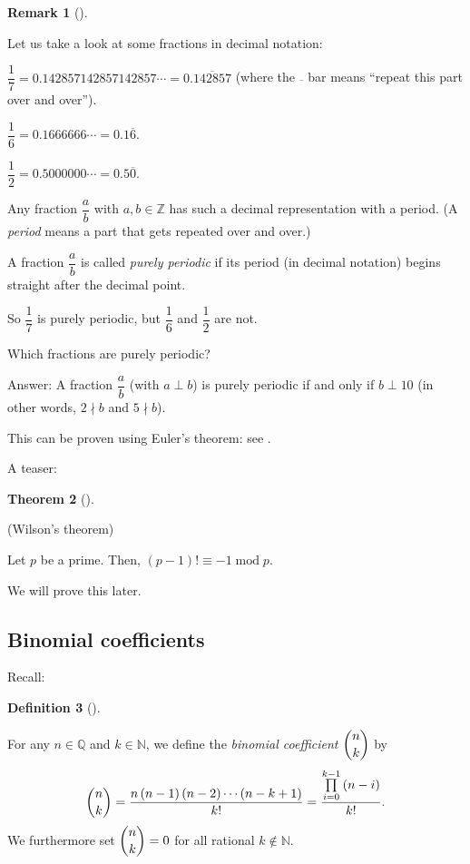 \documentclass[numbers=enddot,12pt,final,onecolumn,notitlepage]{scrartcl}%
\numberwithin{exer}{subsection}
\theoremstyle{definition}
\newtheorem{theo}{Theorem}[subsection]
\newenvironment{theorem}[1][]
{\begin{theo}[#1]\begin{leftbar}}
{\end{leftbar}\end{theo}}
\newtheorem{defi}[theo]{Definition}
\newenvironment{definition}[1][]
{\begin{defi}[#1]\begin{leftbar}}
{\end{leftbar}\end{defi}}
\newtheorem{remk}[theo]{Remark}
\newenvironment{remark}[1][]
{\begin{remk}[#1]\begin{leftbar}}
{\end{leftbar}\end{remk}}
\let\prodnonlimits\prod
\renewcommand{\prod}{\prodnonlimits\limits}
\begin{document}
\begin{remark}
Let us take a look at some fractions in decimal notation:

$\dfrac{1}{7}=\allowbreak0.142857142857142857\cdots=0.\overline{142857}$
(where the $\overline{}$ bar means \textquotedblleft repeat this part over and
over\textquotedblright).

$\dfrac{1}{6}=\allowbreak0.1666666\cdots=0.1\overline{6}$.

$\dfrac{1}{2}=\allowbreak0.5000000\cdots=0.5\overline{0}$.

Any fraction $\dfrac{a}{b}$ with $a,b\in\mathbb{Z}$ has such a decimal
representation with a period. (A \textit{period} means a part that gets
repeated over and over.)

A fraction $\dfrac{a}{b}$ is called \textit{purely periodic} if its period (in
decimal notation) begins straight after the decimal point.

So $\dfrac{1}{7}$ is purely periodic, but $\dfrac{1}{6}$ and $\dfrac{1}{2}$
are not.

Which fractions are purely periodic?

Answer: A fraction $\dfrac{a}{b}$ (with $a\perp b$) is purely periodic if and
only if $b\perp10$ (in other words, $2\nmid b$ and $5\nmid b$).

This can be proven using Euler's theorem: see \cite{Conrad-Euler}.
\end{remark}

A teaser:

\begin{theorem}
(Wilson's theorem)

Let $p$ be a prime. Then, $\left(  p-1\right)  !\equiv-1\operatorname{mod}p$.
\end{theorem}

We will prove this later.

\subsection{Binomial coefficients}

Recall:

\begin{definition}
For any $n\in\mathbb{Q}$ and $k\in\mathbb{N}$, we define the \textit{binomial
coefficient} $\dbinom{n}{k}$ by
\[
\dbinom{n}{k}=\dfrac{n\left(  n-1\right)  \left(  n-2\right)  \cdots\left(
n-k+1\right)  }{k!}=\dfrac{\prod_{i=0}^{k-1}\left(  n-i\right)  }{k!}.
\]
We furthermore set $\dbinom{n}{k}=0$ for all rational $k\notin\mathbb{N}$.
\end{definition}
\end{document}
